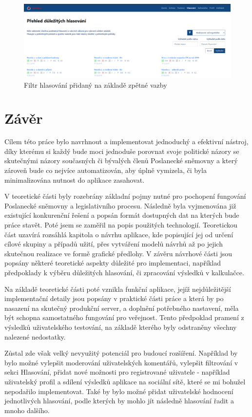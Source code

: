 \begin{figure}
    \centering
    \includegraphics[width=1\textwidth]{obrazky-figures/aplikace-filter.png}
    \caption{Filtr hlasování přidaný na základě zpětné vazby}
    \label{fig:aplikace-filter}
\end{figure}

\chapter{Závěr}
\label{chap:zaver}

Cílem této práce bylo navrhnout a implementovat jednoduchý a efektivní nástroj, díky kterému si každý bude moci jednoduše porovnat svoje politické názory se skutečnými názory současných či bývalých členů Poslanecké sněmovny a který zároveň bude co nejvíce automatizován, aby úplně vymizela, či byla minimalizována nutnost do aplikace zasahovat.
\par V teoretické části byly rozebrány základní pojmy nutné pro pochopení fungování Poslanecké sněmovny a legislativního procesu. Následně byla vyjmenována již existující konkurenční řešení a popsán formát dostupných dat na kterých bude práce stavět. Poté jsem se zaměřil na popis použitých technologií. Teoretickou část uzavírá rozsáhlá kapitola o návrhu aplikace, kde popisující jej od určení cílové skupiny a případů užití, přes vytváření modelů návrhů až po jejich skutečnou realizace ve formě grafické předlohy. V závěru návrhové části jsou popsány některé teoretické aspekty důležité pro implementaci, například předpoklady k výběru důležitých hlasování, či zpracování výsledků v kalkulačce.
\par Na základě teoretické části poté vznikla funkční aplikace, jejíž nejdůležitější implementační detaily jsou popsány v praktické části práce a která by po nasazení na skutečný produkční server, a doplnění potřebného nastavení, měla být schopna samostatného fungování pro veřejnost. Tento předpoklad pramení z výsledků uživatelského testování, na základě kterého byly odstraněny všechny nalezené nedostatky. 
\par Zůstal zde však velký nevyužitý potenciál pro budoucí rozšíření. Například by bylo možné vylepšit moderování uživatelských komentářů, vylepšit filtrování v sekci Hlasování, přidat nové možnosti pro registrované uživatele - například uživatelský profil a sdílení výsledků aplikace na sociální sítě, které se mi bohužel nepodařilo implementovat. Také by bylo možné přidat uživatelské hodnocení jednotlivých hlasování, podle kterých by mohlo jít následně hlasování řadit a mnoho dalšího. 
